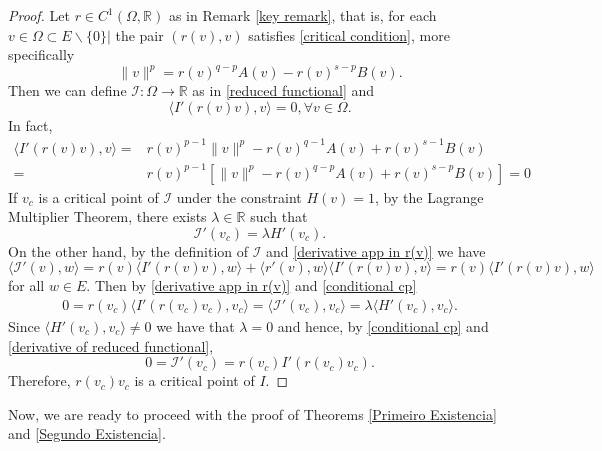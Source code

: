 \documentclass[12pt,reqno]{amsart}
\begin{document}
\begin{proof} Let $r\in C^1(\Omega, \mathds{R})$ as in  Remark \ref{key remark}, that is, for each $v \in \Omega\subset E\backslash \{0\}|$ the pair $(r(v),v)$ satisfies \eqref{critical condition}, more specifically
\begin{equation*}
    \|v\|^p=r(v)^{q-p}A(v)-r(v)^{s-p}B(v).
\end{equation*}
Then we can define $\mathcal{I}:\Omega \rightarrow \mathds{R}$ as in \eqref{reduced functional} and 
\begin{equation}\label{derivative app in r(v)}
    \langle I'(r(v)v),v\rangle=0, \forall v \in \Omega.
\end{equation}
In fact,
\begin{align*}
    \langle I'(r(v)v),v\rangle=& r(v)^{p-1} \|v\|^p-r(v)^{q-1}A(v)+r(v)^{s-1}B(v)\\
    =&r(v)^{p-1}[\|v\|^p-r(v)^{q-p}A(v)+r(v)^{s-p}B(v)]=0
\end{align*}
If $v_c$ is a critical point of $\mathcal{I}$ under the constraint $H(v)=1$, by the Lagrange Multiplier Theorem, there exists $\lambda \in \mathds{R}$ such that 
	\begin{equation}\label{conditional cp}
		\mathcal{I}'(v_c)=\lambda H'(v_c).
	\end{equation}
On the other hand, by the definition of $\mathcal{I}$ and \eqref{derivative app in r(v)} we have 
	\begin{equation}\label{derivative of reduced functional}
		\langle \mathcal{I}'(v),w\rangle=r(v)\langle I'(r(v)v),w \rangle+\langle r'(v),w\rangle \langle I'(r(v)v),v\rangle= r(v)\langle I'(r(v)v),w \rangle
	\end{equation}
	for all $w \in E$.
Then by \eqref{derivative app in r(v)} and \eqref{conditional cp} 
\begin{align*}
  0=r(v_c)  \langle {I}'(r(v_c)v_c),v_c\rangle=\langle \mathcal{I}'(v_c),v_c\rangle=\lambda \langle H'(v_c),v_c\rangle.
\end{align*}
Since $\langle H'(v_c),v_c\rangle\neq0$ we have that $\lambda=0$ and hence, by \eqref{conditional cp} and \eqref{derivative of reduced functional},
 	\[
	0=\mathcal{I}'(v_c)= r(v_c)I'(r(v_c)v_c).
 \]
 Therefore, $r(v_c)v_c$ is a critical point of $I$.
\end{proof}

Now, we are ready to proceed with the proof of Theorems \ref{Primeiro Existencia} and \ref{Segundo Existencia}.  
\end{document}
